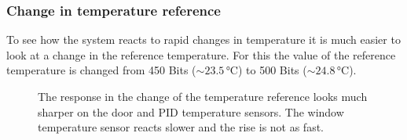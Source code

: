 \documentclass[12pt]{scrartcl}
\begin{document}
      \subsubsection{Change in temperature reference}
      To see how the system reacts to rapid changes in temperature it is much
      easier to look at a change in the reference temperature. For this the value
      of the reference temperature is changed from 450 Bits ($\sim 23.5
      \,\text{°C}$) to 500 Bits ($\sim 24.8 \,\text{°C}$). \\
      \begin{figure}[H]
        \hspace{-40pt}
        \hspace{-20pt}
        \caption{The response in the change of the temperature reference looks
        much sharper on the door and PID temperature sensors. The window temperature
        sensor reacts slower and the rise is not as fast.}
        \label{fig12}
      \end{figure}
\end{document}
